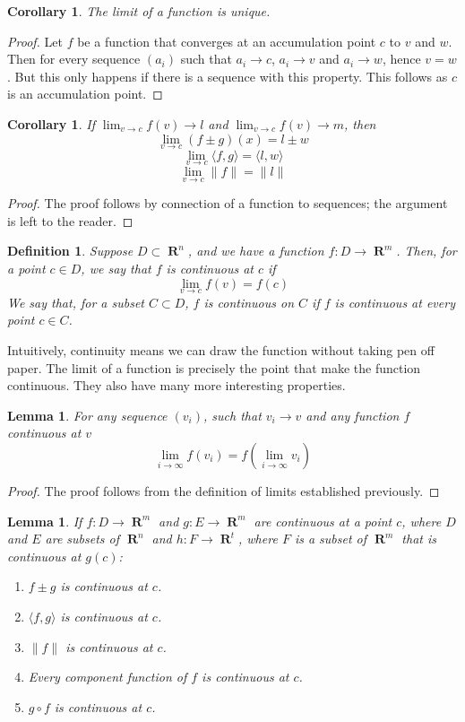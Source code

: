 \documentclass{report}
\newtheorem{lemma}[theorem]{Lemma}
\newtheorem{corollary}[theorem]{Corollary}
\newtheorem{definition}{Definition}
\DeclareMathOperator{\real}{\mathbf{R}}
\begin{document}
\begin{corollary}
  The limit of a function is unique.
\end{corollary}
\begin{proof}
  Let $f$ be a function that converges at an accumulation point $c$ to $v$ and $w$. Then for every sequence $(a_i)$ such that $a_i \to c$, $a_i \to v$ and $a_i \to w$, hence $v = w$. But this only happens if there is a sequence with this property. This follows as $c$ is an accumulation point.
\end{proof}

\begin{corollary}
  If $\lim_{v \to c} f(v) \to l$ and $\lim_{v \to c} f(v) \to m$, then
  \[ \lim_{v \to c} (f \pm g)(x) = l \pm w \]
  \[ \lim_{v \to c} \langle f, g \rangle = \langle l, w \rangle \]
  \[ \lim_{v \to c} \| f \| = \| l \| \]
\end{corollary}
\begin{proof}
  The proof follows by connection of a function to sequences; the argument is left to the reader.
\end{proof}

\begin{definition}
  Suppose $D \subset \real^n$, and we have a function $f:D \to \real^m$. Then, for a point $c \in D$, we say that $f$ is continuous at $c$ if
  \[ \lim_{v \to c} f(v) = f(c) \]
  We say that, for a subset $C \subset D$, $f$ is continuous on $C$ if $f$ is continuous at every point $c \in C$.
\end{definition}

Intuitively, continuity means we can draw the function without taking pen off paper. The limit of a function is precisely the point that make the function continuous. They also have many more interesting properties.

\begin{lemma}
  For any sequence $(v_i)$, such that $v_i \to v$ and any function $f$ continuous at $v$
  \[ \lim_{i \to \infty} f(v_i) = f(\lim_{i \to \infty} v_i) \]
\end{lemma}
\begin{proof}
  The proof follows from the definition of limits established previously.
\end{proof}

\begin{lemma}
  If $f:D \to \real^m$ and $g:E \to \real^m$ are continuous at a point $c$, where $D$ and $E$ are subsets of $\real^n$ and $h:F \to \real^t$, where $F$ is a subset of $\real^m$ that is continuous at $g(c)$:

  \begin{enumerate}
    \item $f \pm g$ is continuous at $c$.
    \item $\langle f, g \rangle$ is continuous at $c$.
    \item $\|f\|$ is continuous at $c$.
    \item Every component function of $f$ is continuous at $c$.
    \item $g \circ f$ is continuous at $c$.
  \end{enumerate}
\end{lemma}
\end{document}
